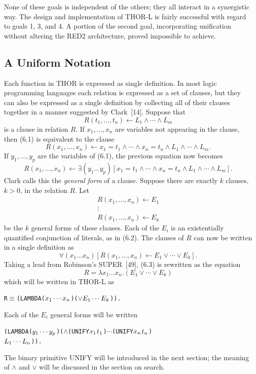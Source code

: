 None of these goals is independent of the others; they all interact in a
synergistic way. The design and implementation of THOR-L is fairly successful
with regard to goals 1, 3, and 4. A portion of the second goal, incorporating
unification without altering the RED2 architecture, proved impossible to
achieve.

\subsection{A Uniform Notation}

Each function in THOR is expressed as single definition. In most logic
programming languages each relation is expressed as a set of clauses, but they
can also be expressed as a single definition by collecting all of their clauses
together in a manner suggested by Clark~[14]. Suppose that
\[
R(t_1,\ldots,t_n)\leftarrow L_1\wedge\cdots\wedge L_m
\tag{6.1}
\]
is a clause in relation \(R\). If \(x_1,\ldots,x_n\) are variables not appearing
in the clause, then (6.1) is equivalent to the clause
\[
R(x_1,\ldots,x_n)\leftarrow x_1=t_1\wedge\cdots\wedge x_n=t_n
\wedge L_1\wedge\cdots\wedge L_m.
\]
If \(y_1,\ldots,y_p\) are the variables of (6.1), the previous equation now
becomes
\[
R(x_1,\ldots,x_n)\leftarrow
\exists(y_1\ldots y_p)[x_1=t_1\wedge\cdots\wedge x_n=t_n
\wedge L_1\wedge\cdots\wedge L_m].
\tag{6.2}
\]
Clark calls this the \emph{general form} of a clause. Suppose there are exactly \(k\)
clauses, \(k>0\), in the relation \(R\). Let
\[
\begin{array}{c}
R(x_1,\ldots,x_n)\leftarrow E_1\\
\vdots\\
R(x_1,\ldots,x_n)\leftarrow E_k
\end{array}
\]
be the \(k\) general forms of these clauses. Each of the \(E_i\) is an
existentially quantified conjunction of literals, as in (6.2). The clauses of
\(R\) can now be written in a single definition as
\[
\forall(x_1\ldots x_n)[R(x_1,\ldots,x_n)\leftarrow E_1\vee\cdots\vee E_k].
\tag{6.3}
\]
Taking a lead from Robinson's SUPER~[49], (6.3) is rewritten as the equation
\[
R=\lambda x_1\ldots x_n.(E_1\vee\cdots\vee E_k)
\]
which will be written in THOR-L as
\begin{alltt}
R \(\equiv\) (LAMBDA (\(x\sb{1} \cdots x\sb{n}\)) (\(\vee\) \(E\sb{1} \cdots E\sb{k}\))).
\end{alltt}
Each of the \(E_i\) general forms will be written
\begin{alltt}
(LAMBDA (\(y\sb{1} \cdots y\sb{p}\)) (\(\wedge\) (UNIFY \(x\sb{1}\) \(t\sb{1}\)) \(\cdots\) (UNIFY \(x\sb{n}\) \(t\sb{n}\))
                     \(L\sb{1} \cdots L\sb{n}\))).
\end{alltt}
The binary primitive UNIFY will be introduced in the next section; the meaning
of \(\wedge\) and \(\vee\) will be discussed in the section on search.

